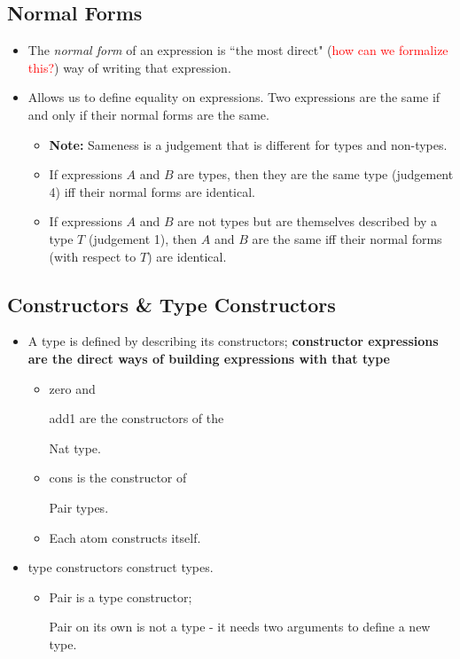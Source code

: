 \documentclass{article}
\newcommand*{\SavedLstInline}{}
\DeclareRobustCommand*{\lstinline}{%
  \ifmmode
    \let\SavedBGroup\bgroup
    \def\bgroup{%
      \let\bgroup\SavedBGroup
      \hbox\bgroup
    }%
  \fi
  \SavedLstInline
}
\begin{document}
\subsection{Normal Forms}
\begin{itemize}
    \item The \textit{normal form} of an expression is ``the most direct" (\textcolor{red}{how can we formalize this?}) way of writing that expression.
    \item Allows us to define equality on expressions. Two expressions are the same if and only if their normal forms are the same.
        \begin{itemize}
            \item \textbf{Note:} Sameness is a judgement that is different for types and non-types.
            \item If expressions \(A\) and \(B\) are types, then they are the same type (judgement 4) iff their normal forms are identical.
            \item If expressions \(A\) and \(B\) are not types but are themselves described by a type \(T\) (judgement 1), then \(A\) and \(B\) are the same iff their normal forms (with respect to \(T\)) are identical.
        \end{itemize}
\end{itemize}

\subsection{Constructors \& Type Constructors}
\begin{itemize}
    \item A type is defined by describing its constructors; \textbf{constructor expressions are the direct ways of building expressions with that type}
        \begin{itemize}
            \item \lstinline{zero} and \lstinline{add1} are the constructors of the \lstinline{Nat} type.
            \item \lstinline{cons} is the constructor of \lstinline{Pair} types.
            \item Each atom constructs itself.
        \end{itemize}
    \item type constructors construct types.
        \begin{itemize}
            \item \lstinline{Pair} is a type constructor; \lstinline{Pair} on its own is not a type - it needs two arguments to define a new type.
        \end{itemize}
\end{itemize}
\end{document}
